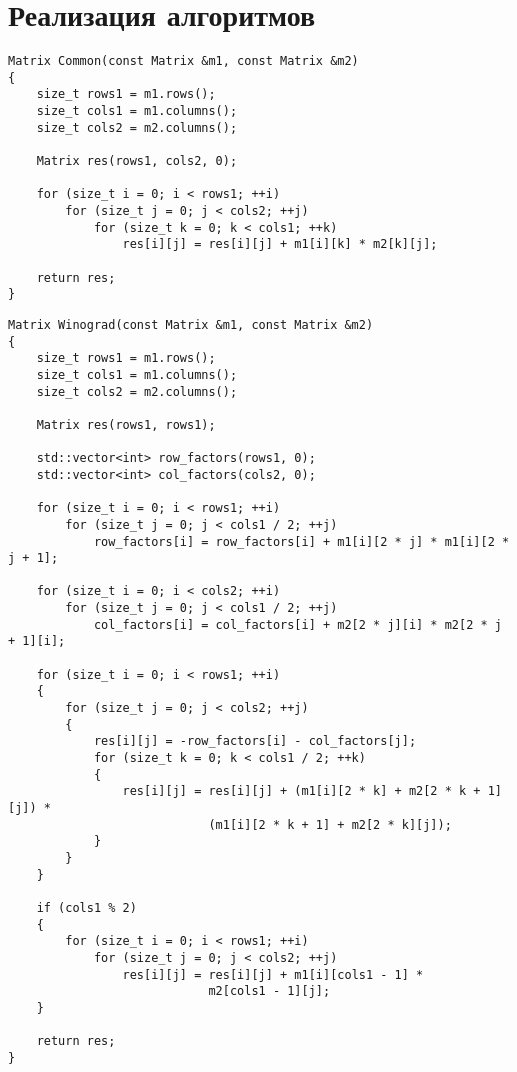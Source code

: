 \clearpage
\section{Реализация алгоритмов}

\begin{lstlisting}[label={lst:common}, caption={Реализация классического алгоритма умножения матриц}]
Matrix Common(const Matrix &m1, const Matrix &m2)
{
    size_t rows1 = m1.rows();
    size_t cols1 = m1.columns();
    size_t cols2 = m2.columns();

    Matrix res(rows1, cols2, 0);

    for (size_t i = 0; i < rows1; ++i)
        for (size_t j = 0; j < cols2; ++j)
            for (size_t k = 0; k < cols1; ++k)
                res[i][j] = res[i][j] + m1[i][k] * m2[k][j];

    return res;
}
\end{lstlisting}

\begin{lstlisting}[label={lst:winograd}, caption={Реализация алгоритма Винограда}]
Matrix Winograd(const Matrix &m1, const Matrix &m2)
{
    size_t rows1 = m1.rows();
    size_t cols1 = m1.columns();
    size_t cols2 = m2.columns();

    Matrix res(rows1, rows1);

    std::vector<int> row_factors(rows1, 0);
    std::vector<int> col_factors(cols2, 0);

    for (size_t i = 0; i < rows1; ++i)
        for (size_t j = 0; j < cols1 / 2; ++j)
            row_factors[i] = row_factors[i] + m1[i][2 * j] * m1[i][2 * j + 1];

    for (size_t i = 0; i < cols2; ++i)
        for (size_t j = 0; j < cols1 / 2; ++j)
            col_factors[i] = col_factors[i] + m2[2 * j][i] * m2[2 * j + 1][i];

    for (size_t i = 0; i < rows1; ++i)
    {
        for (size_t j = 0; j < cols2; ++j)
        {
            res[i][j] = -row_factors[i] - col_factors[j];
            for (size_t k = 0; k < cols1 / 2; ++k)
            {
                res[i][j] = res[i][j] + (m1[i][2 * k] + m2[2 * k + 1][j]) *
                            (m1[i][2 * k + 1] + m2[2 * k][j]);
            }
        }
    }

    if (cols1 % 2)
    {
        for (size_t i = 0; i < rows1; ++i)
            for (size_t j = 0; j < cols2; ++j)
                res[i][j] = res[i][j] + m1[i][cols1 - 1] *
                            m2[cols1 - 1][j];
    }

    return res;
}
\end{lstlisting}

